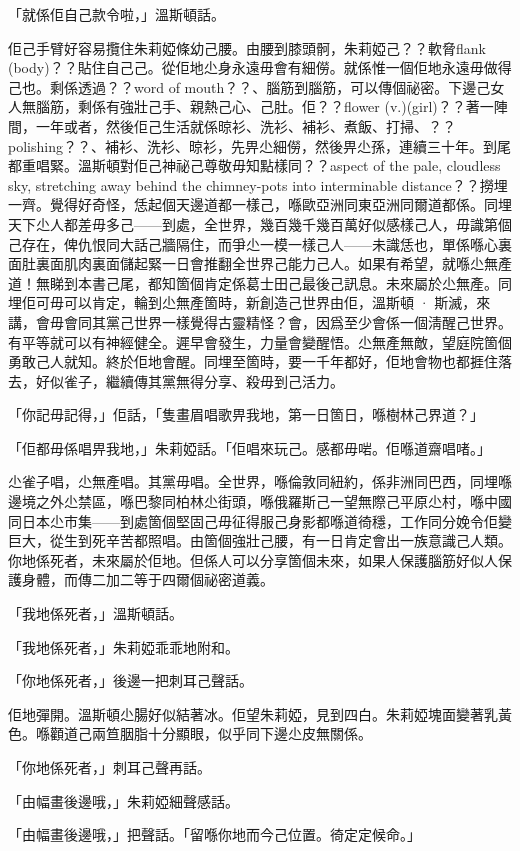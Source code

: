「就係佢自己款令啦，」溫斯頓話。

佢己手臂好容易攬住朱莉婭條幼己腰。由腰到膝頭䯊，朱莉婭己？？軟脅flank (body)？？貼住自己己。從佢地尐身永遠毋會有細僗。就係惟一個佢地永遠毋做得己也。剩係透過？？word of mouth？？、腦筋到腦筋，可以傳個祕密。下邊己女人無腦筋，剩係有強壯己手、親熱己心、己肚。佢？？flower (v.)(girl)？？著一陣間，一年或者，然後佢己生活就係晾衫、洗衫、補衫、煮飯、打掃、？？polishing？？、補衫、洗衫、晾衫，先畀尐細僗，然後畀尐孫，連續三十年。到尾都重唱緊。溫斯頓對佢己神祕己尊敬毋知點樣同？？aspect of the pale, cloudless sky, stretching away behind the chimney-pots into interminable distance？？撈埋一齊。覺得好奇怪，恁起個天邊道都一樣己，喺歐亞洲同東亞洲同爾道都係。同埋天下尐人都差毋多己——到處，全世界，幾百幾千幾百萬好似感樣己人，毋識第個己存在，俾仇恨同大話己牆隔住，而爭尐一模一樣己人——未識恁也，單係喺心裏面肚裏面肌肉裏面儲起緊一日會推翻全世界己能力己人。如果有希望，就喺尐無產道！無睇到本書己尾，都知箇個肯定係葛士田己最後己訊息。未來屬於尐無產。同埋佢可毋可以肯定，輪到尐無產箇時，新創造己世界由佢，溫斯頓 · 斯滅，來講，會毋會同其黨己世界一樣覺得古靈精怪？會，因爲至少會係一個淸醒己世界。有平等就可以有神經健全。遲早會發生，力量會變醒悟。尐無產無敵，望庭院箇個勇敢己人就知。終於佢地會醒。同埋至箇時，要一千年都好，佢地會物也都捱住落去，好似雀子，繼續傳其黨無得分享、殺毋到己活力。

「你記毋記得，」佢話，「隻畫眉唱歌畀我地，第一日箇日，喺樹林己界道？」

「佢都毋係唱畀我地，」朱莉婭話。「佢唱來玩己。感都毋啱。佢喺道齋唱啫。」

尐雀子唱，尐無產唱。其黨毋唱。全世界，喺倫敦同紐約，係非洲同巴西，同埋喺邊境之外尐禁區，喺巴黎同柏林尐街頭，喺俄羅斯己一望無際己平原尐村，喺中國同日本尐市集——到處箇個堅固己毋征得服己身影都喺道徛穩，工作同分娩令佢變巨大，從生到死辛苦都照唱。由箇個強壯己腰，有一日肯定會出一族意識己人類。你地係死者，未來屬於佢地。但係人可以分享箇個未來，如果人保護腦筋好似人保護身體，而傳二加二等于四爾個祕密道義。

「我地係死者，」溫斯頓話。

「我地係死者，」朱莉婭乖乖地附和。

「你地係死者，」後邊一把刺耳己聲話。

佢地彈開。溫斯頓尐腸好似結著冰。佢望朱莉婭，見到四白。朱莉婭塊面變著乳黃色。喺顴道己兩笪胭脂十分顯眼，似乎同下邊尐皮無關係。

「你地係死者，」刺耳己聲再話。

「由幅畫後邊哦，」朱莉婭細聲感話。

「由幅畫後邊哦，」把聲話。「留喺你地而今己位置。徛定定候命。」

